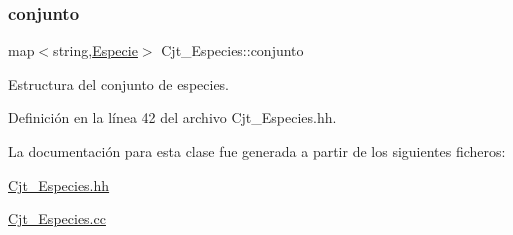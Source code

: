 \mbox{\label{class_cjt___especies_a82ed53cbd620caca3db6b5c20b37a60a}} 
\subsubsection{\texorpdfstring{conjunto}{conjunto}}
{\footnotesize\ttfamily map$<$string,\hyperlink{class_especie}{Especie}$>$ Cjt\+\_\+\+Especies\+::conjunto\hspace{0.3cm}{\ttfamily [private]}}



Estructura del conjunto de especies. 



Definición en la línea 42 del archivo Cjt\+\_\+\+Especies.\+hh.



La documentación para esta clase fue generada a partir de los siguientes ficheros\+:\begin{DoxyCompactItemize}
\item 
\hyperlink{_cjt___especies_8hh}{Cjt\+\_\+\+Especies.\+hh}\item 
\hyperlink{_cjt___especies_8cc}{Cjt\+\_\+\+Especies.\+cc}\end{DoxyCompactItemize}

